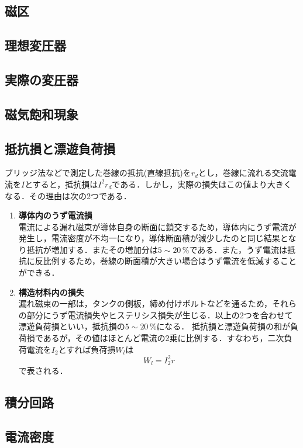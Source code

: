 \subsection{磁区}
\subsection{理想変圧器}
\subsection{実際の変圧器}
\subsection{磁気飽和現象}\label{hohwa}
\subsection{抵抗損と漂遊負荷損\cite{1130282271832577152}}
ブリッジ法などで測定した巻線の抵抗(直線抵抗)を$r_{d}$とし，巻線に流れる交流電流を$I$とすると，抵抗損は$I^{2}r_{d}$である．しかし，実際の損失はこの値より大きくなる．その理由は次の2つである．
\begin{enumerate}[(1)]
	\item \textbf{導体内のうず電流損}\\
	電流による漏れ磁束が導体自身の断面に鎖交するため，導体内にうず電流が発生し，電流密度が不均一になり，導体断面積が減少したのと同じ結果となり抵抗が増加する．またその増加分は$5 \sim 20\,\%$である．また，うず電流は抵抗に反比例するため，巻線の断面積が大きい場合はうず電流を低減することができる\cite{11302822718325772}\cite{1130282270467697152}．
	\item \textbf{構造材料内の損失}\\
	漏れ磁束の一部は，タンクの側板，締め付けボルトなどを通るため，それらの部分にうず電流損失やヒステリシス損失が生じる．以上の2つを合わせて漂遊負荷損といい，抵抗損の$5 \sim 20\,\%$になる．
	抵抗損と漂遊負荷損の和が負荷損であるが，その値はほとんど電流の2乗に比例する．すなわち，二次負荷電流を$I_{2}$とすれば負荷損$W_{l}$は
	\begin{equation}
		W_{l}=I_{2}^{2}r
	\end{equation}
	で表される．
\end{enumerate}

\subsection{積分回路}
\subsection{電流密度}
